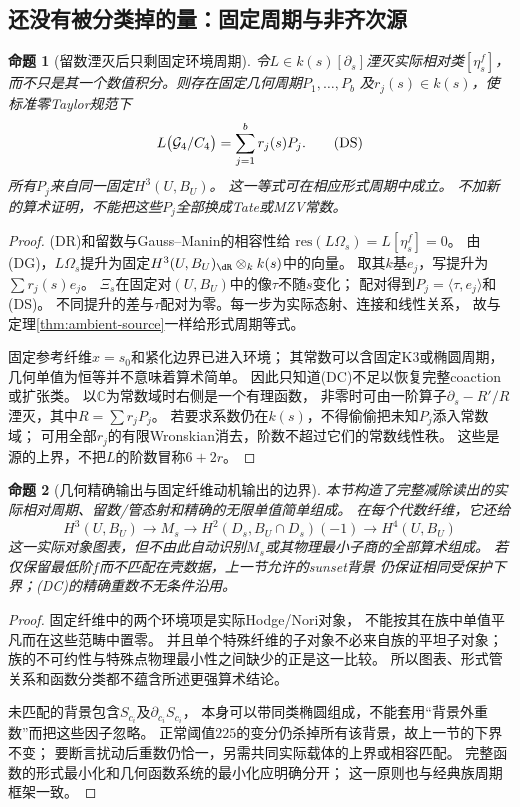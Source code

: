 \documentclass[11pt,a4paper]{ctexart}
\theoremstyle{cnplain}\newtheorem{theorem}{定理}[section]
\newtheorem{proposition}[theorem]{命题}
\theoremstyle{definition}\newtheorem{definition}[theorem]{定义}
\theoremstyle{remark}\newtheorem{remark}[theorem]{注}
\begin{document}
\subsection{还没有被分类掉的量：固定周期与非齐次源}
\begin{proposition}[留数湮灭后只剩固定环境周期]\label{prop:dispersionconstants}
令$L\in k(s)[\partial_s]$湮灭实际相对类$[\eta_s^f]$，
而不只是其一个数值积分。则存在固定几何周期$P_1,\ldots,P_b$
及$r_j(s)\in k(s)$，使标准零Taylor规范下
\[
 L\bigl({\cal G}_4/C_4\bigr)=\sum_{j=1}^b r_j(s)P_j .
 \tag{DS}\label{eq:dispersionsource}
\]
所有$P_j$来自同一固定$H^3(U,B_U)$。
这一等式可在相应形式周期中成立。
不加新的算术证明，不能把这些$P_j$全部换成Tate或MZV常数。
\end{proposition}
\begin{proof}
(DR)和留数与Gauss--Manin的相容性给
$\mathrm{res}(L\Omega_s)=L[\eta_s^f]=0$。
由(DG)，$L\Omega_s$提升为固定$H^3(U,B_U)_{\dR}\otimes_k k(s)$中的向量。
取其$k$基$e_j$，写提升为$\sum r_j(s)e_j$。
$\Xi_s$在固定对$(U,B_U)$中的像$\tau$不随$s$变化；
配对得到$P_j=\langle\tau,e_j\rangle$和(DS)。
不同提升的差与$\tau$配对为零。每一步为实际态射、连接和线性关系，
故与定理\ref{thm:ambient-source}一样给形式周期等式。

固定参考纤维$x=s_0$和紧化边界已进入环境；
其常数可以含固定K3或椭圆周期，几何单值为恒等并不意味着算术简单。
因此只知道(DC)不足以恢复完整coaction或扩张类。
以$\mathbb C$为常数域时右侧是一个有理函数，
非零时可由一阶算子$\partial_s-R'/R$湮灭，其中$R=\sum r_jP_j$。
若要求系数仍在$k(s)$，不得偷偷把未知$P_j$添入常数域；
可用全部$r_j$的有限Wronskian消去，阶数不超过它们的常数线性秩。
这些是源的上界，不把$L$的阶数冒称$6+2r$。
\end{proof}

\begin{proposition}[几何精确输出与固定纤维动机输出的边界]\label{prop:dispersionarithmeticboundary}
本节构造了完整减除读出的实际相对周期、留数/管态射和精确的无限单值简单组成。
在每个代数纤维，它还给
\[
 H^3(U,B_U)\longrightarrow M_s\longrightarrow
 H^2(D_s,B_U\cap D_s)(-1)\longrightarrow H^4(U,B_U)
\]
这一实际对象图表，但不由此自动识别$M_s$或其物理最小子商的全部算术组成。
若仅保留最低阶$f$而不匹配在壳数据，上一节允许的sunset背景
仍保证相同受保护下界；(DC)的精确重数不无条件沿用。
\end{proposition}
\begin{proof}
固定纤维中的两个环境项是实际Hodge/Nori对象，
不能按其在族中单值平凡而在这些范畴中置零。
并且单个特殊纤维的子对象不必来自族的平坦子对象；
族的不可约性与特殊点物理最小性之间缺少的正是这一比较。
所以图表、形式管关系和函数分类都不蕴含所述更强算术结论。

未匹配的背景包含$S_{c_i}$及$\partial_{c_i}S_{c_i}$，
本身可以带同类椭圆组成，不能套用“背景外重数”而把这些因子忽略。
正常阈值$225$的变分仍杀掉所有该背景，故上一节的下界不变；
要断言扰动后重数仍恰一，另需共同实际载体的上界或相容匹配。
完整函数的形式最小化和几何函数系统的最小化应明确分开；
这一原则也与经典族周期框架\cite[\S2.4、\S7--8]{brown}一致。
\end{proof}
\end{document}
